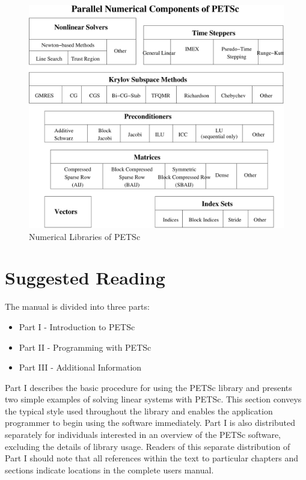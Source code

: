 \begin{figure}[hbt]
\centerline{ \includegraphics[scale=0.75]{zoom}}
\caption{Numerical Libraries of PETSc}
\label{fig_2}
\end{figure}

\section{Suggested Reading}

The manual is
divided into three parts:
\begin{itemize}
\item Part I - Introduction to PETSc
\item Part II - Programming with PETSc
\item Part III - Additional Information
\end{itemize}

Part I describes
the basic procedure for using the PETSc library and presents two
simple examples of solving linear systems with PETSc.  This section
conveys the typical style used throughout the library and enables the
application programmer to begin using the software immediately.
Part I is also distributed separately for individuals interested in an
overview of the PETSc software, excluding the details of library usage.
Readers of this separate distribution of Part I should note that all
references within the text to particular chapters and sections
indicate locations in the complete users manual.


